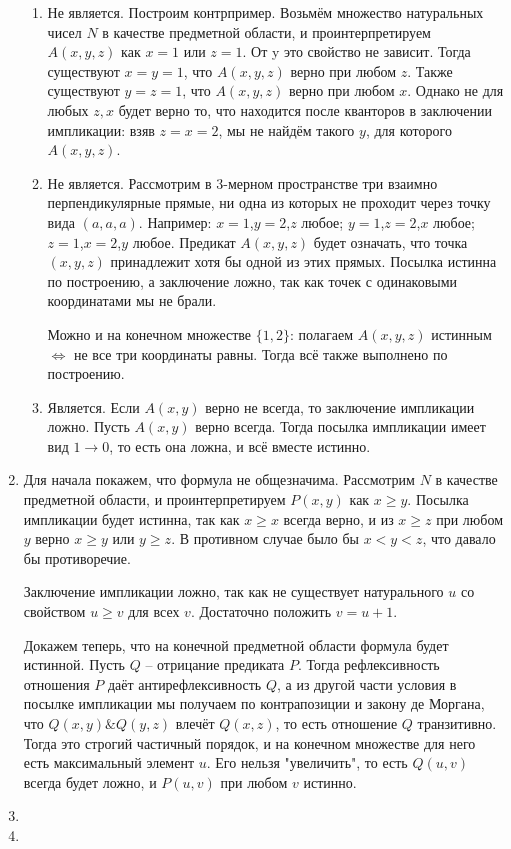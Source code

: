 \documentclass[11pt]{article}
\begin{document}
\begin{enumerate}
\begin{enumerate}
			\item Не является. Построим контрпример. Возьмём множество натуральных чисел $N$ в качестве предметной области, и проинтерпретируем $A(x,y,z)$ как $x=1$ или $z=1$. От y это свойство не зависит. Тогда существуют $x=y=1$, что $A(x,y,z)$ верно при любом $z$. Также существуют $y=z=1$, что $A(x,y,z)$ верно при любом $x$. Однако не для любых $z,x$ будет верно то, что находится после кванторов в заключении импликации: взяв $z=x=2$, мы не найдём такого $y$, для которого $A(x,y,z)$.
			
			\item Не является. Рассмотрим в 3-мерном пространстве три взаимно перпендикулярные прямые, ни одна из которых не проходит через точку вида $(a,a,a)$. Например: $x=1$,$y=2$,$z$ любое; $y=1$,$z=2$,$x$ любое; $z=1$,$x=2$,$y$ любое. Предикат $A(x,y,z)$ будет означать, что точка $(x,y,z)$ принадлежит хотя бы одной из этих прямых. Посылка истинна по построению, а заключение ложно, так как точек с одинаковыми координатами мы не брали.
			
			Можно и на конечном множестве $\{1,2\}$: полагаем $A(x,y,z)$ истинным $\Leftrightarrow$ не все три координаты равны. Тогда всё также выполнено по построению.
			
			\item Является. Если $A(x,y)$ верно не всегда, то заключение импликации ложно. Пусть $A(x,y)$ верно всегда. Тогда посылка импликации имеет вид $1\to 0$, то есть она ложна, и всё вместе истинно.
		\end{enumerate}
	\item Для начала покажем, что формула не общезначима. Рассмотрим $N$ в качестве предметной области, и проинтерпретируем $P(x,y)$ как $x\ge y$. Посылка импликации будет истинна, так как $x\ge x$ всегда верно, и из $x\ge z$ при любом $y$ верно $x\ge y$ или $y\ge z$. В противном случае было бы $x < y < z$, что давало бы противоречие.
	
	Заключение импликации ложно, так как не существует натурального $u$ со свойством $u\ge v$ для всех $v$. Достаточно положить $v=u+1$.
	
	Докажем теперь, что на конечной предметной области формула будет истинной. Пусть $Q$ -- отрицание предиката $P$. Тогда рефлексивность отношения $P$ даёт антирефлексивность $Q$, а из другой части условия в посылке импликации мы получаем по контрапозиции и закону де Моргана, что $Q(x,y)\& Q(y,z)$ влечёт $Q(x,z)$, то есть отношение $Q$ транзитивно. Тогда это строгий частичный порядок, и на конечном множестве для него есть максимальный элемент $u$. Его нельзя "увеличить", то есть $Q(u,v)$ всегда будет ложно, и $P(u,v)$ при любом $v$ истинно.
	\item 
	\item
	\end{enumerate}
\end{document}
